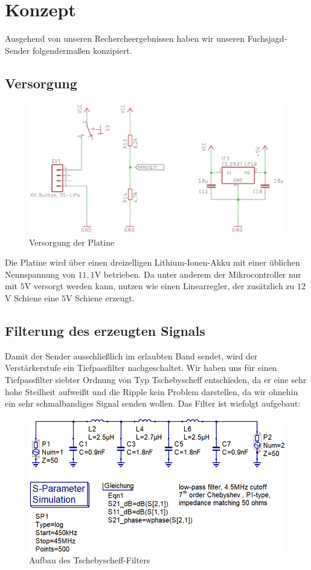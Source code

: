 \section{Konzept}
Ausgehend von unseren Rechercheergebnissen haben wir unseren Fuchsjagd-Sender
folgendermaßen konzipiert.
\subsection{Versorgung}
\begin{figure}[H]
    \centering
    \includegraphics{res/Versorgung.png}
    \caption{Versorgung der Platine}
\end{figure}
Die Platine wird über einen dreizelligen Lithium-Ionen-Akku mit einer üblichen Nennspannung
von $11,1$V betrieben. Da unter anderem der Mikrocontroller nur mit $5$V versorgt
werden kann, nutzen wie einen Linearregler, der zusätzlich zu $12$V Schiene eine
$5$V Schiene erzeugt.

\subsection{Filterung des erzeugten Signals}
Damit der Sender ausschließlich im erlaubten Band sendet, wird der Verstärkerstufe
ein Tiefpassfilter nachgeschaltet. Wir haben uns für einen Tiefpassfilter siebter 
Ordnung von Typ Tschebyscheff entschieden, da er eine sehr hohe Steilheit aufweißt
und die Ripple kein Problem darstellen, da wir ohnehin ein sehr schmalbandiges
Signal senden wollen. Das Filter ist wiefolgt aufgebaut:
\begin{figure}[H]
    \includegraphics{res/TP_Schaltplan.png}
    \caption{Aufbau des Tschebyscheff-Filters}
\end{figure}

